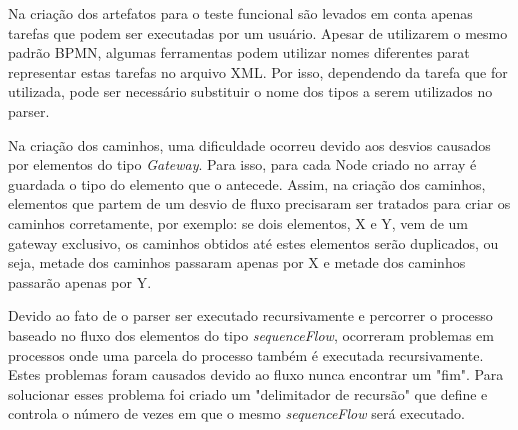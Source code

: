 \documentclass[12pt]{article}
\begin{document}
Na criação dos artefatos para o teste funcional são levados em conta apenas tarefas que podem ser executadas por um usuário. Apesar de utilizarem o mesmo padrão BPMN, algumas ferramentas podem utilizar nomes diferentes parat representar estas tarefas no arquivo XML. Por isso, dependendo da tarefa que for utilizada, pode ser necessário substituir o nome dos tipos a serem utilizados no parser.



Na criação dos caminhos, uma dificuldade ocorreu devido aos desvios causados por elementos do tipo \emph{Gateway}. Para isso, para cada Node criado no array é guardada o tipo do elemento que o antecede. Assim, na criação dos caminhos, elementos que partem de um desvio de fluxo precisaram ser tratados para criar os caminhos corretamente, por exemplo: se dois elementos, X e Y, vem de um gateway exclusivo, os caminhos obtidos até estes elementos serão duplicados, ou seja, metade dos caminhos passaram apenas por X e metade dos caminhos passarão apenas por Y.


Devido ao fato de o parser ser executado recursivamente e percorrer o processo baseado no fluxo dos elementos do tipo \emph{sequenceFlow}, ocorreram problemas em processos onde uma parcela do processo também é executada recursivamente. Estes problemas foram causados devido ao fluxo nunca encontrar um "fim". Para solucionar esses problema foi criado um "delimitador de recursão" que define e controla o número de vezes em que o mesmo \emph{sequenceFlow} será executado.
\end{document}
